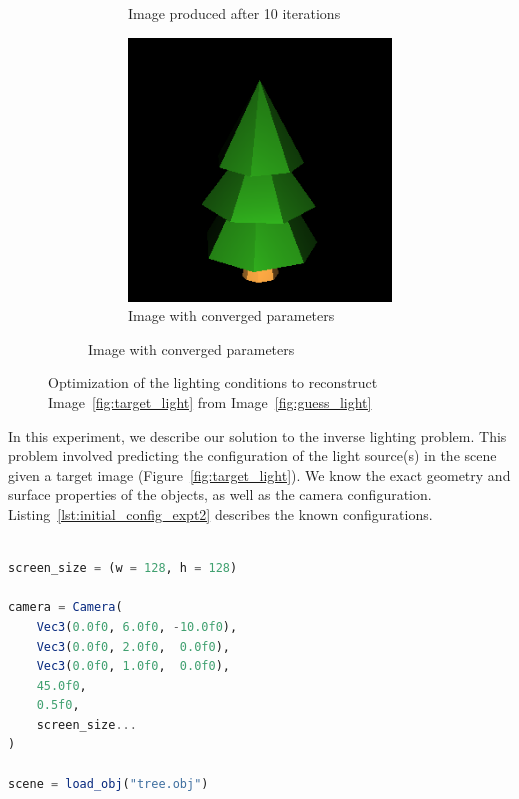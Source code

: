\documentclass{juliacon}
\begin{document}
\begin{figure}[!htb]
\begin{subfigure}[c]{0.45\textwidth}
\begin{subfigure}[c]{0.45\textwidth}
            \caption{Image produced after 10 iterations}
        \end{subfigure}
        \hfill
        \begin{subfigure}[c]{0.45\textwidth}
            \centering
            \includegraphics[width=\textwidth]{images/light/501.png}
            \caption{Image with converged parameters}
        \end{subfigure}
    \end{subfigure}
    \caption{Optimization of the lighting conditions to reconstruct Image~\ref{fig:target_light} from Image~\ref{fig:guess_light}}
    \label{fig:light_position}
\end{figure}

In this experiment, we describe our solution to the inverse lighting problem. This problem involved predicting the configuration of the light source(s) in the scene given a target image (Figure~\ref{fig:target_light}). We know the exact geometry and surface properties of the objects, as well as the camera configuration. Listing~\ref{lst:initial_config_expt2} describes the known configurations.

\noindent
\begin{minipage}{\linewidth}
\begin{lstlisting}[caption = {Configuration of the Scene for Experiment~\ref{sec:light_source}},
                   label = {lst:initial_config_expt2},
                   captionpos = b,
                   language = Julia]

screen_size = (w = 128, h = 128)

camera = Camera(
    Vec3(0.0f0, 6.0f0, -10.0f0),
    Vec3(0.0f0, 2.0f0,  0.0f0),
    Vec3(0.0f0, 1.0f0,  0.0f0),
    45.0f0,
    0.5f0,
    screen_size...
)

scene = load_obj("tree.obj")
\end{lstlisting}
\end{minipage}
\end{document}
